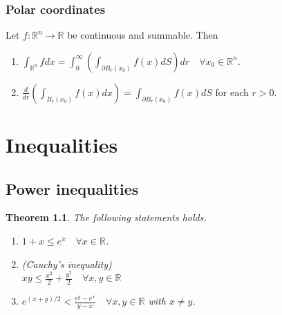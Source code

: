 \documentclass[11pt,a4paper]{report}
\newtheorem{theorem}{Theorem}[section]
\theoremstyle{definition}
\begin{document}
\subsection{Polar coordinates}

Let $f: \mathbb{R}^{n} \rightarrow \mathbb{R}$ be continuous and summable. 
Then
\begin{enumerate}[label=(\alph*)]
\item 
$\displaystyle \int_{\mathbb{R}^{n}} f d x=\int_{0}^{\infty}\left(\int_{\partial B_r(x_{0})} f(x) d S\right) d r \quad \forall x_{0} \in \mathbb{R}^{n}$.
\item $\displaystyle \frac{d}{d r}\left(\int_{B_r(x_{0})} f(x) d x\right)=\int_{\partial B_r(x_{0})} f(x) d S$ for each $r>0$.
\end{enumerate}


\chapter{Inequalities} 

\section{Power inequalities}

\begin{theorem}
	The following statements holds.
	\begin{enumerate}[label=(\alph*)] 
		\rm\item $1 + x \leq e^{x} \quad \forall x \in \mathbb{R}$.
		\rm\item (Cauchy's inequality) \\[0.1cm]
		$\displaystyle xy \leq \frac{x^{2}}{2}+\frac{y^{2}}{2} \quad \forall x, y \in \mathbb{R}$ 
		\rm\item $\displaystyle e^{(x + y)/2} < \frac{e^{y} - e^{x}}{y - x} \quad \forall x, y \in \mathbb{R}$ with $x \neq y$.
	\end{enumerate}
	
\end{theorem}
\end{document}
